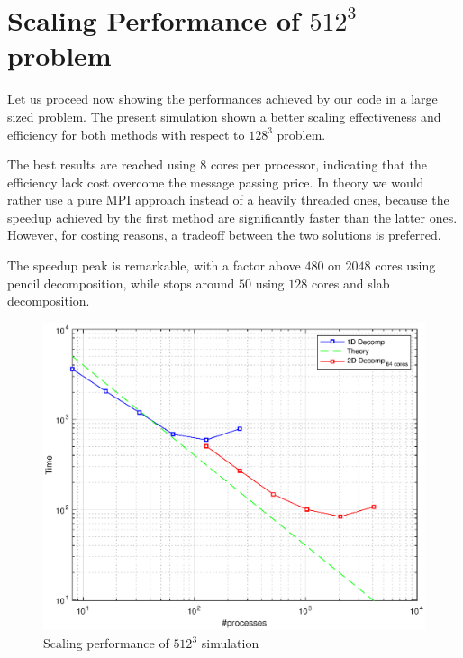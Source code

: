 \section{Scaling Performance of $512^3$ problem}
Let us proceed now showing the performances achieved by our code in a large sized problem.
The present simulation shown a better scaling effectiveness and efficiency for both methods with respect to $128^{3}$ problem. 
\par
The best results are reached using 8 cores per processor, indicating that the efficiency lack cost overcome the message passing price.
In theory we would rather use a pure MPI approach instead of a heavily threaded ones, because the speedup achieved by the first method are significantly faster than the latter ones. However, for costing reasons, a tradeoff between the two solutions is preferred. \\
\par
The speedup peak is remarkable, with a factor above $480$ on $2048$ cores using pencil decomposition, while stops around $50$ using $128$ cores and slab decomposition. \\
\par

\begin{figure}
\begin{center}
\includegraphics[scale=0.6]{grafici/5121}
\caption{Scaling performance of $512^3$ simulation}
\label{5121}
\end{center}
\end{figure}

